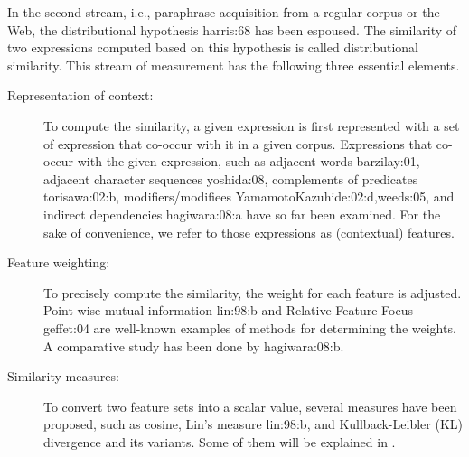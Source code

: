 \documentclass[english]{jnlp_1.4}
\renewcommand{\cite}{}
\newcommand{\newcite}{}
\begin{document}
In the second stream, i.e., paraphrase acquisition from a regular
corpus or the Web, the distributional hypothesis \cite{harris:68} has
been espoused.  The similarity of two expressions computed based on
this hypothesis is called distributional similarity.
This stream of measurement has the following three essential elements.
\begin{description}
\item[Representation of context:] To compute the similarity, a given
  expression is first represented with a set of expression that
  co-occur with it in a given corpus.  Expressions that co-occur with
  the given expression, such as adjacent words \cite{barzilay:01},
  adjacent character sequences \cite{yoshida:08}, complements of
  predicates \cite{torisawa:02:b}, modifiers/modifiees
  \cite{YamamotoKazuhide:02:d,weeds:05}, and indirect dependencies
  \cite{hagiwara:08:a} have so far been examined.  For the sake of
  convenience, we refer to those expressions as (contextual) features.
\item[Feature weighting:] To precisely compute the similarity, the
  weight for each feature is adjusted.  Point-wise mutual information
  \cite{lin:98:b} and Relative Feature Focus \cite{geffet:04} are
  well-known examples of methods for determining the weights.  A
  comparative study has been done by \newcite{hagiwara:08:b}.
\item[Similarity measures:] To convert two feature sets into a scalar
  value, several measures have been proposed, such as cosine, Lin's
  measure \cite{lin:98:b}, and Kullback-Leibler (KL) divergence and
  its variants.  Some of them will be explained in .
\end{description}
\end{document}
